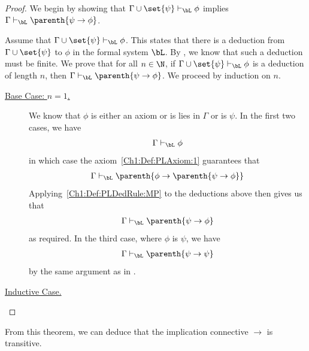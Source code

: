 \begin{proof}
    We begin by showing that $\Gamma \cup \set{\psi} \vdash_{\bL} \phi$ implies $\Gamma \vdash_{\bL} \parenth{\psi \to \phi}$.

    Assume that $\Gamma \cup \set{\psi} \vdash_{\bL} \phi$. This states that there is a deduction from $\Gamma \cup \set{\psi}$ to $\phi$ in the formal system $\bL$. By , we know that such a deduction must be finite. We prove that for all $n \in \N$, if $\Gamma \cup \set{\psi} \vdash_{\bL} \phi$ is a deduction of length $n$, then $\Gamma \vdash_{\bL} \parenth{\psi \to \phi}$. We proceed by induction on $n$.

    \begin{description}
        \item[\underline{Base Case: $n = 1$.}]
        We know that $\phi$ is either an axiom or is lies in $\Gamma$ or is $\psi$. In the first two cases, we have
        \begin{align*}
            \Gamma \vdash_{\bL} \phi
        \end{align*}
        in which case the axiom~\ref{Ch1:Def:PLAxiom:1} guarantees that
        \begin{align*}
            \Gamma \vdash_{\bL} \parenth{\phi \to \parenth{\psi \to \phi}}
        \end{align*}
        Applying~\ref{Ch1:Def:PLDedRule:MP} to the deductions above then gives us that
        \begin{align*}
            \Gamma \vdash_{\bL} \parenth{\psi \to \phi}
        \end{align*}
        as required. In the third case, where $\phi$ is $\psi$, we have
        \begin{align*}
            \Gamma \vdash_{\bL} \parenth{\psi \to \psi}
        \end{align*}
        by the same argument as in .
    
    \item[\underline{Inductive Case.}] \sorry
    \end{description}
\end{proof}

From this theorem, we can deduce that the implication connective $\to$ is transitive.

